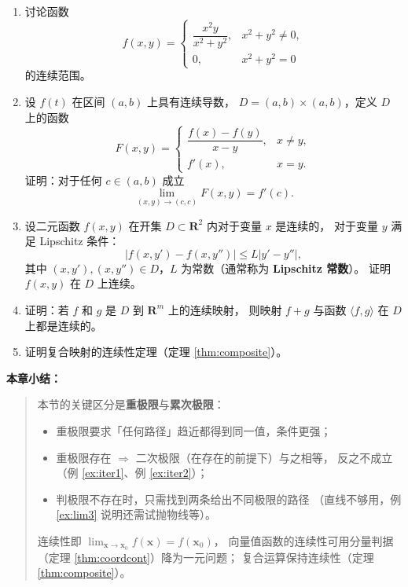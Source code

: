 \documentclass[11pt]{ctexart}
\newenvironment{chaptersummary}
  {\par\medskip\noindent\textbf{本章小结：}\begin{quote}}
  {\end{quote}}
\theoremstyle{plain}
\theoremstyle{definition}
\theoremstyle{remark}
\begin{document}
\begin{enumerate}
\[\begin{cases}
            \dfrac{2}{x^2}\Bigl(y-\dfrac{1}{2}x^2\Bigr), & x>0\ \text{且}\ \tfrac{1}{2}x^2<y\le x^2,\\[6pt]
            \dfrac{1}{x^2}\bigl(2x^2-y\bigr), & x>0\ \text{且}\ x^2<y<2x^2,\\[6pt]
            0, & \text{其他点}
          \end{cases}
        \]
        在原点不连续，而在其他点连续。
  \item 讨论函数
        \[
          f(x,y)=
          \begin{cases}
            \dfrac{x^2y}{x^2+y^2}, & x^2+y^2\neq 0,\\[6pt]
            0, & x^2+y^2=0
          \end{cases}
        \]
        的连续范围。
  \item 设 \(f(t)\) 在区间 \((a,b)\) 上具有连续导数，
        \(D=(a,b)\times(a,b)\)，定义 \(D\) 上的函数
        \[
          F(x,y)=
          \begin{cases}
            \dfrac{f(x)-f(y)}{x-y}, & x\neq y,\\[6pt]
            f'(x), & x=y .
          \end{cases}
        \]
        证明：对于任何 \(c\in(a,b)\) 成立
        \[
          \lim_{(x,y)\to(c,c)}F(x,y)=f'(c).
        \]
  \item 设二元函数 \(f(x,y)\) 在开集 \(D\subset\mathbf{R}^2\) 内对于变量 \(x\) 是连续的，
        对于变量 \(y\) 满足 Lipschitz 条件：
        \[
          |f(x,y')-f(x,y'')|\le L|y'-y''|,
        \]
        其中 \((x,y'),(x,y'')\in D\)，\(L\) 为常数（通常称为 \textbf{Lipschitz 常数}）。
        证明 \(f(x,y)\) 在 \(D\) 上连续。
  \item 证明：若 \(f\) 和 \(g\) 是 \(D\) 到 \(\mathbf{R}^m\) 上的连续映射，
        则映射 \(f+g\) 与函数 \(\langle f,g\rangle\) 在 \(D\) 上都是连续的。
  \item 证明复合映射的连续性定理（定理 \ref{thm:composite}）。
\end{enumerate}

\begin{chaptersummary}
本节的关键区分是\textbf{重极限}与\textbf{累次极限}：
\begin{itemize}
  \item 重极限要求「任何路径」趋近都得到同一值，条件更强；
  \item 重极限存在 $\Rightarrow$ 二次极限（在存在的前提下）与之相等，
        反之不成立（例 \ref{ex:iter1}、例 \ref{ex:iter2}）；
  \item 判极限不存在时，只需找到两条给出不同极限的路径
        （直线不够用，例 \ref{ex:lim3} 说明还需试抛物线等）。
\end{itemize}
连续性即 \(\lim_{\boldsymbol{x}\to\boldsymbol{x}_0}f(\boldsymbol{x})=f(\boldsymbol{x}_0)\)，
向量值函数的连续性可用分量判据（定理 \ref{thm:coordcont}）降为一元问题；
复合运算保持连续性（定理 \ref{thm:composite}）。
\end{chaptersummary}
\end{document}
